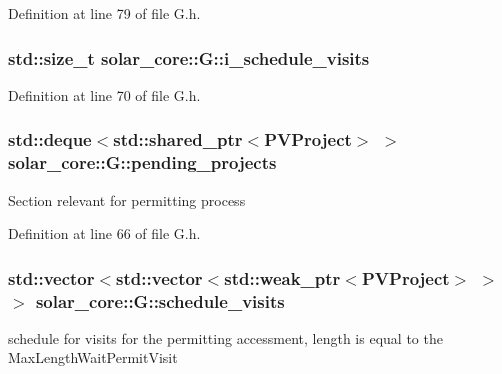 Definition at line 79 of file G.\+h.

\hypertarget{classsolar__core_1_1_g_a5c79440fcadc7d3e9212c5e7c05f84f7}{}
\subsubsection[{i\+\_\+schedule\+\_\+visits}]{\setlength{\rightskip}{0pt plus 5cm}std\+::size\+\_\+t solar\+\_\+core\+::\+G\+::i\+\_\+schedule\+\_\+visits\hspace{0.3cm}{\ttfamily [protected]}}\label{classsolar__core_1_1_g_a5c79440fcadc7d3e9212c5e7c05f84f7}


Definition at line 70 of file G.\+h.

\hypertarget{classsolar__core_1_1_g_a471a7f64e44432bd6d2f2974f507d669}{}
\subsubsection[{pending\+\_\+projects}]{\setlength{\rightskip}{0pt plus 5cm}std\+::deque$<$std\+::shared\+\_\+ptr$<${\bf P\+V\+Project}$>$ $>$ solar\+\_\+core\+::\+G\+::pending\+\_\+projects\hspace{0.3cm}{\ttfamily [protected]}}\label{classsolar__core_1_1_g_a471a7f64e44432bd6d2f2974f507d669}
Section relevant for permitting process 

Definition at line 66 of file G.\+h.

\hypertarget{classsolar__core_1_1_g_a33472d3b331a303ec8a9b61e2da163d3}{}
\subsubsection[{schedule\+\_\+visits}]{\setlength{\rightskip}{0pt plus 5cm}std\+::vector$<$std\+::vector$<$std\+::weak\+\_\+ptr$<${\bf P\+V\+Project}$>$ $>$ $>$ solar\+\_\+core\+::\+G\+::schedule\+\_\+visits\hspace{0.3cm}{\ttfamily [protected]}}\label{classsolar__core_1_1_g_a33472d3b331a303ec8a9b61e2da163d3}
schedule for visits for the permitting accessment, length is equal to the Max\+Length\+Wait\+Permit\+Visit 

